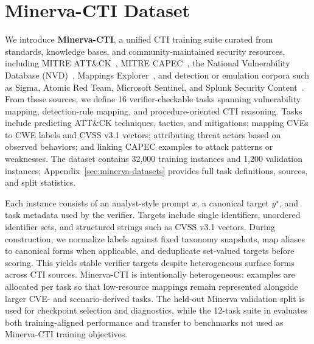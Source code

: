 \section{Minerva-CTI Dataset}
\label{sec:minerva-cti}

We introduce \textbf{Minerva-CTI}, a unified CTI training suite curated from standards, knowledge bases, and community-maintained security resources, including MITRE ATT\&CK~\citep{mitre_attack,attack_stix_data}, MITRE CAPEC~\citep{capec}, the National Vulnerability Database (NVD)~\citep{nvd,cwe}, Mappings Explorer~\citep{mappings_explorer}, and detection or emulation corpora such as Sigma, Atomic Red Team, Microsoft Sentinel, and Splunk Security Content~\citep{sigma,atomic_red_team,azure_sentinel,splunk_security_content}. From these sources, we define 16 verifier-checkable tasks spanning vulnerability mapping, detection-rule mapping, and procedure-oriented CTI reasoning. Tasks include predicting ATT\&CK techniques, tactics, and mitigations; mapping CVEs to CWE labels and CVSS v3.1 vectors; attributing threat actors based on observed behaviors; and linking CAPEC examples to attack patterns or weaknesses. The dataset contains 32{,}000 training instances and 1{,}200 validation instances; Appendix~\ref{sec:minerva-datasets} provides full task definitions, sources, and split statistics.

Each instance consists of an analyst-style prompt $x$, a canonical target $y^\star$, and task metadata used by the verifier. Targets include single identifiers, unordered identifier sets, and structured strings such as CVSS v3.1 vectors. During construction, we normalize labels against fixed taxonomy snapshots, map aliases to canonical forms when applicable, and deduplicate set-valued targets before scoring. This yields stable verifier targets despite heterogeneous surface forms across CTI sources. Minerva-CTI is intentionally heterogeneous: examples are allocated per task so that low-resource mappings remain represented alongside larger CVE- and scenario-derived tasks. The held-out Minerva validation split is used for checkpoint selection and diagnostics, while the 12-task suite in  evaluates both training-aligned performance and transfer to benchmarks not used as Minerva-CTI training objectives.